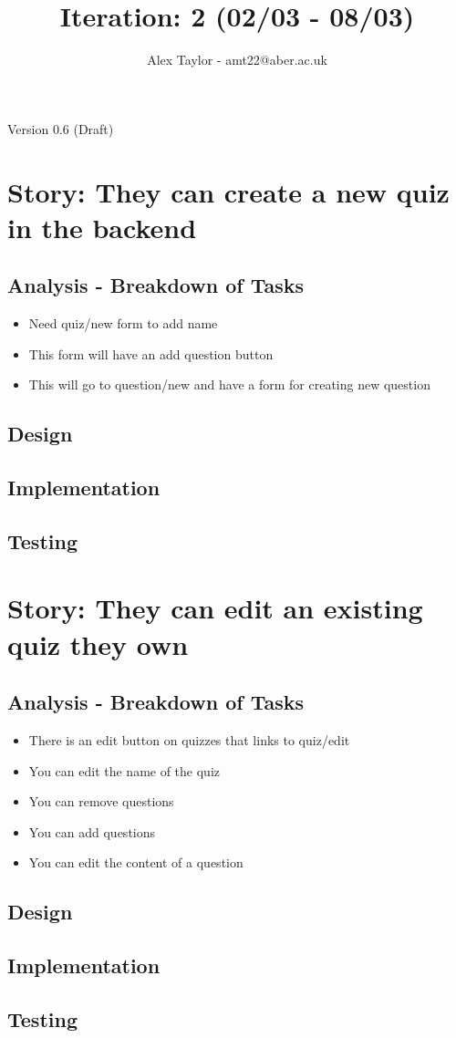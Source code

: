 \documentclass{article}
\title{Iteration: 2 (02/03 - 08/03)}
\author{Alex Taylor - amt22@aber.ac.uk}
\begin{document}
\maketitle
\begin{center}
	Version 0.6 (Draft)
\end{center}
\tableofcontents
\thispagestyle{empty}
\newpage

\section{Story: They can create a new quiz in the backend}
\subsection{Analysis - Breakdown of Tasks}
\begin{itemize}
	\item Need quiz/new form to add name
	\item This form will have an add question button
	\item This will go to question/new and have a form for creating new question
\end{itemize}
\subsection{Design}
\subsection{Implementation}
\subsection{Testing}
\newpage

\section{Story: They can edit an existing quiz they own}
\subsection{Analysis - Breakdown of Tasks}
\begin{itemize}
	\item There is an edit button on quizzes that links to quiz/edit
	\item You can edit the name of the quiz
	\item You can remove questions
	\item You can add questions
	\item You can edit the content of a question
\end{itemize}
\subsection{Design}
\subsection{Implementation}
\subsection{Testing}
\newpage


%
%
\end{document}
